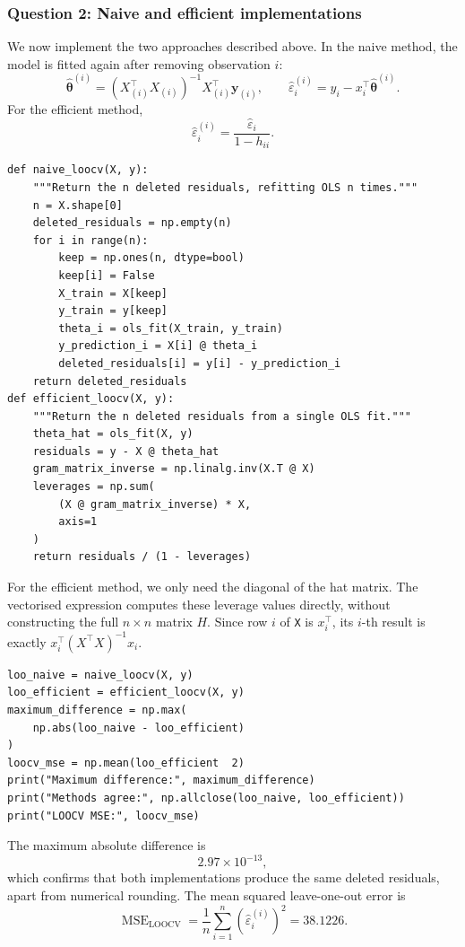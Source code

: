\documentclass[11pt,a4paper]{article}
\begin{document}
\subsubsection{Question 2: Naive and efficient implementations}
We now implement the two approaches described above. In the naive method, the
model is fitted again after removing observation $i$:
\[
    \widehat{\bm\theta}^{(i)}
    =\left(X_{(i)}^\top X_{(i)}\right)^{-1}
      X_{(i)}^\top\bm y_{(i)},
    \qquad
    \widehat\varepsilon_i^{(i)}
    =y_i-x_i^\top\widehat{\bm\theta}^{(i)}.
\]
For the efficient method,
\[
    \widehat\varepsilon_i^{(i)}
    =\frac{\widehat\varepsilon_i}{1-h_{ii}}.
\]
\begin{lstlisting}[caption={Naive and efficient LOOCV implementations.}]
def naive_loocv(X, y):
    """Return the n deleted residuals, refitting OLS n times."""
    n = X.shape[0]
    deleted_residuals = np.empty(n)
    for i in range(n):
        keep = np.ones(n, dtype=bool)
        keep[i] = False
        X_train = X[keep]
        y_train = y[keep]
        theta_i = ols_fit(X_train, y_train)
        y_prediction_i = X[i] @ theta_i
        deleted_residuals[i] = y[i] - y_prediction_i
    return deleted_residuals
def efficient_loocv(X, y):
    """Return the n deleted residuals from a single OLS fit."""
    theta_hat = ols_fit(X, y)
    residuals = y - X @ theta_hat
    gram_matrix_inverse = np.linalg.inv(X.T @ X)
    leverages = np.sum(
        (X @ gram_matrix_inverse) * X,
        axis=1
    )
    return residuals / (1 - leverages)
\end{lstlisting}
For the efficient method, we only need the diagonal of the hat matrix. The
vectorised expression computes these leverage values directly, without
constructing the full $n\times n$ matrix $H$. Since row $i$ of \texttt{X} is
$x_i^\top$, its $i$-th result is exactly
$x_i^\top(X^\top X)^{-1}x_i$.
\begin{lstlisting}[caption={Numerical comparison of the two methods.}]
loo_naive = naive_loocv(X, y)
loo_efficient = efficient_loocv(X, y)
maximum_difference = np.max(
    np.abs(loo_naive - loo_efficient)
)
loocv_mse = np.mean(loo_efficient  2)
print("Maximum difference:", maximum_difference)
print("Methods agree:", np.allclose(loo_naive, loo_efficient))
print("LOOCV MSE:", loocv_mse)
\end{lstlisting}
\begin{resultbox}
The maximum absolute difference is
\[
    2.97\times10^{-13},
\]
which confirms that both implementations produce the same deleted residuals,
apart from numerical rounding. The mean squared leave-one-out error is
\[
    \operatorname{MSE}_{\mathrm{LOOCV}}
    =\frac1n\sum_{i=1}^n
      \left(\widehat\varepsilon_i^{(i)}\right)^2
    =38.1226.
\]
\end{resultbox}
\end{document}
